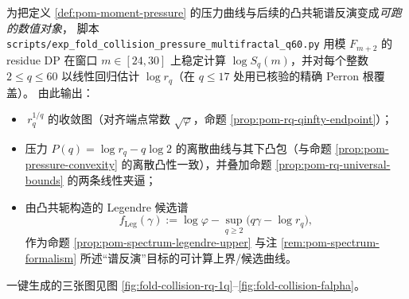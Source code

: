 \begin{remark}\label{rem:pom-pressure-multifractal-q60}
为把定义 \ref{def:pom-moment-pressure} 的压力曲线与后续的凸共轭谱反演变成\emph{可跑的数值对象}，
脚本 \texttt{scripts/exp\_fold\_collision\_pressure\_multifractal\_q60.py} 用模 \(F_{m+2}\) 的 residue DP 在窗口 \(m\in[24,30]\) 上稳定计算 \(\log S_q(m)\)，并对每个整数 \(2\le q\le 60\) 以线性回归估计 \(\log r_q\)（在 \(q\le 17\) 处用已核验的精确 Perron 根覆盖）。
由此输出：
\begin{itemize}
  \item \(\,r_q^{1/q}\) 的收敛图（对齐端点常数 \(\sqrt{\varphi}\)，命题 \ref{prop:pom-rq-qinfty-endpoint}）；
  \item 压力 \(P(q)=\log r_q-q\log 2\) 的离散曲线与其下凸包（与命题 \ref{prop:pom-pressure-convexity} 的离散凸性一致），并叠加命题 \ref{prop:pom-rq-universal-bounds} 的两条线性夹逼；
  \item 由凸共轭构造的 Legendre 候选谱
  \[
  f_{\mathrm{Leg}}(\gamma):=\log\varphi-\sup_{q\ge 2}\bigl(q\gamma-\log r_q\bigr),
  \]
  作为命题 \ref{prop:pom-spectrum-legendre-upper} 与注 \ref{rem:pom-spectrum-formalism} 所述“谱反演”目标的可计算上界/候选曲线。
\end{itemize}
一键生成的三张图见图 \ref{fig:fold-collision-rq-1q}--\ref{fig:fold-collision-falpha}。



\end{remark}

